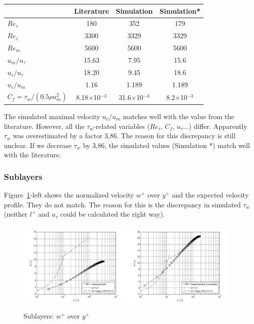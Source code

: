 \documentclass[11pt,a4paper]{article}
\begin{document}
\begin{center}
\begin{tabular}{|l|c|c|c|}
\hline
 & Literature & Simulation & Simulation* \\\hline
$Re_\tau$ & 180 & 352 & 179\\\hline
$Re_c$ & 3300 & 3329 & 3329 \\\hline
$Re_m$ & 5600 & 5600 & 5600\\\hline
$u_m/u_\tau$ & 15.63 & 7.95 & 15.6\\\hline
$u_c/u_\tau$ & 18.20 & 9.45 & 18.6\\\hline
$u_c/u_m$ & 1.16 & 1.189 & 1.189\\\hline
$C_f = \tau_w / (0.5 \rho u_m^2)$ & 8.18$\times$10$^{-3}$ & 31.6$\times$10$^{-3}$ & 8.2$\times$10$^{-3}$\\\hline
\end{tabular}
\end{center}

\noindent The simulated maximal velocity $u_c/u_m$ matches well with the value from the literature. However, all the $\tau_w$-related variables ($Re_\tau$, $C_f$, $u_\tau$...) differ. Apparently $\tau_w$  was overestimated by a factor 3,86. The reason for this discrepancy is still unclear. If we decrease $\tau_w$ by 3,86, the simulated values (Simulation *) match well with the literature.

\newpage
\subsubsection{Sublayers}
Figure~\ref{fig:sublayers}-left shows the normalized velocity $w^+$  over $y^+$ and the expected velocity profile. They do not match. The reason for this is the discrepancy in simulated $\tau_w$ (neither $l^+$ and $u_{\tau}$ could be calculated the right way).


\begin{figure}[h]
    \centering
    \includegraphics[width=0.49\textwidth]{wy1}
    \includegraphics[width=0.49\textwidth]{wy2}
    \caption{Sublayers: $w^+$ over $y^+$}
    \label{fig:sublayers}
\end{figure}
\end{document}
